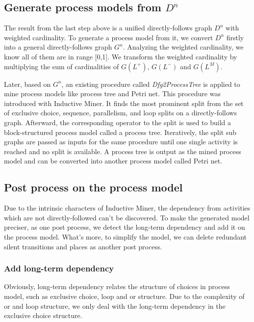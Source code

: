 \subsection{Generate process models from $D^n$}
The result from the last step above is a unified directly-follows graph $D^n$ with weighted cardinality. To generate a process model from it, we convert $D^n$ firstly into a general directly-follows graph $G^n$. Analyzing the weighted cardinality, we know all of them are in range [0,1]. We transform the weighted cardinality by multiplying the sum of cardinalities of $G(L^{+})$, $G(L^-)$ and $G(L^{M})$.  


Later, based on $G^n$, an existing procedure called \emph{Dfg2ProcessTree} is applied to mine process models like process tree and Petri net.  This procedure was introduced with Inductive Miner\cite{leemans2013discovering}. It finds the most prominent split from the set of exclusive choice, sequence, parallelism, and loop splits on  a directly-follows graph.  Afterward, the corresponding operator to the split is used to build a block-structured process model called a process tree. Iteratively, the split sub graphs are passed as inputs for the same procedure until one single activity is reached and no split is available. A process tree is output as the mined process model and can be converted into another process model called Petri net.

\subsection{Post process on the process model}
Due to the intrinsic characters of Inductive Miner, the dependency from activities which are not directly-followed can't be discovered. To make the generated model preciser, as one post process, we detect the long-term dependency and add it on the process model.  What's more, to simplify the model, we can delete redundant silent transitions and places as another post process.  
\subsubsection{Add long-term dependency}
Obviously, long-term dependency relates the structure of choices in process model, such as exclusive choice, loop and or structure. Due to the complexity of or and loop structure, we only deal with the long-term dependency in the exclusive choice structure. 

